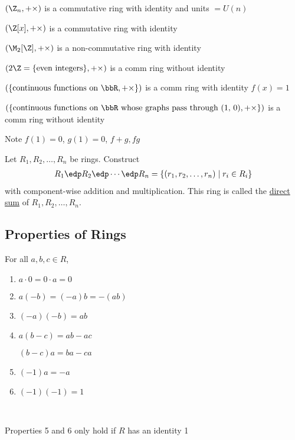 \begin{example}
  \((\Z_n, +\times)\) is a commutative ring with identity and units \(=U(n)\)
\end{example}

\begin{example}
  \((\Z[x], +\times)\) is a commutative ring with identity
\end{example}

\begin{example}
  \((\M_2[\Z], +\times)\) is a non-commutative ring with identity
\end{example}

\begin{example}
  \((2\Z = \{\text{even integers}\}, +\times)\) is a comm ring without identity
\end{example}

\begin{example}
  \((\{\text{continuous functions on \bbR}, +\times\})\) is a comm ring with identity \(f(x) = 1\)
\end{example}

\begin{example}
  \((\{\text{continuous functions on \bbR\ whose graphs pass through (1, 0)}, +\times\})\) is a comm ring without identity

  Note \(f(1) = 0\), \(g(1) = 0\), \(f+g, fg\)
\end{example}

\begin{example}
  Let \(R_1, R_2, \ldots, R_n\) be rings. Construct
  \begin{align*}
    R_1\edp R_2\edp \cdots \edp R_n = \{(r_1, r_2, \ldots, r_n) \mid r_i\in R_i\}
  \end{align*}
  with component-wise addition and multiplication. This ring is called the \uline{direct sum} of \(R_1, R_2, \ldots, R_n\).
\end{example}

\subsection{Properties of Rings}

\begin{theorem}
  For all \(a,b,c\in R\),
\begin{enumerate}
  \item \(a\cdot 0 = 0\cdot a = 0\)
  \item \(a(-b) = (-a)b = -(ab)\)
  \item \((-a)(-b)=ab\)
  \item \(a(b-c) = ab-ac\)

  \((b-c)a = ba-ca\)
  \item \((-1)a = -a\)
  \item \((-1)(-1) = 1\)
\end{enumerate}\

\begin{note}
Properties 5 and 6 only hold if \(R\) has an identity 1
\end{note}
\end{theorem}

